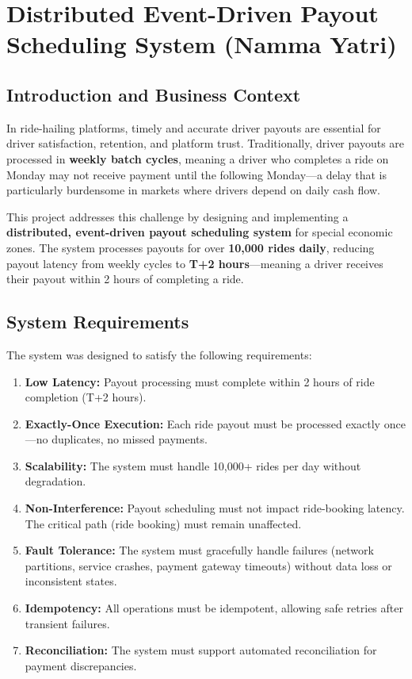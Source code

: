 \documentclass[12pt,a4paper,oneside]{report}
\begin{document}
\chapter[Distributed Payout Scheduling]{Distributed Event-Driven Payout Scheduling System (Namma Yatri)}
\label{chap:payout}


\section{Introduction and Business Context}

In ride-hailing platforms, timely and accurate driver payouts are essential for driver satisfaction, retention, and platform trust. Traditionally, driver payouts are processed in \textbf{weekly batch cycles}, meaning a driver who completes a ride on Monday may not receive payment until the following Monday—a delay that is particularly burdensome in markets where drivers depend on daily cash flow.

This project addresses this challenge by designing and implementing a \textbf{distributed, event-driven payout scheduling system} for special economic zones. The system processes payouts for over \textbf{10,000 rides daily}, reducing payout latency from weekly cycles to \textbf{T+2 hours}—meaning a driver receives their payout within 2 hours of completing a ride.

\section{System Requirements}

The system was designed to satisfy the following requirements:

\begin{enumerate}
    \item \textbf{Low Latency:} Payout processing must complete within 2 hours of ride completion (T+2 hours).
    \item \textbf{Exactly-Once Execution:} Each ride payout must be processed exactly once—no duplicates, no missed payments.
    \item \textbf{Scalability:} The system must handle 10,000+ rides per day without degradation.
    \item \textbf{Non-Interference:} Payout scheduling must not impact ride-booking latency. The critical path (ride booking) must remain unaffected.
    \item \textbf{Fault Tolerance:} The system must gracefully handle failures (network partitions, service crashes, payment gateway timeouts) without data loss or inconsistent states.
    \item \textbf{Idempotency:} All operations must be idempotent, allowing safe retries after transient failures.
    \item \textbf{Reconciliation:} The system must support automated reconciliation for payment discrepancies.
\end{enumerate}
\end{document}
